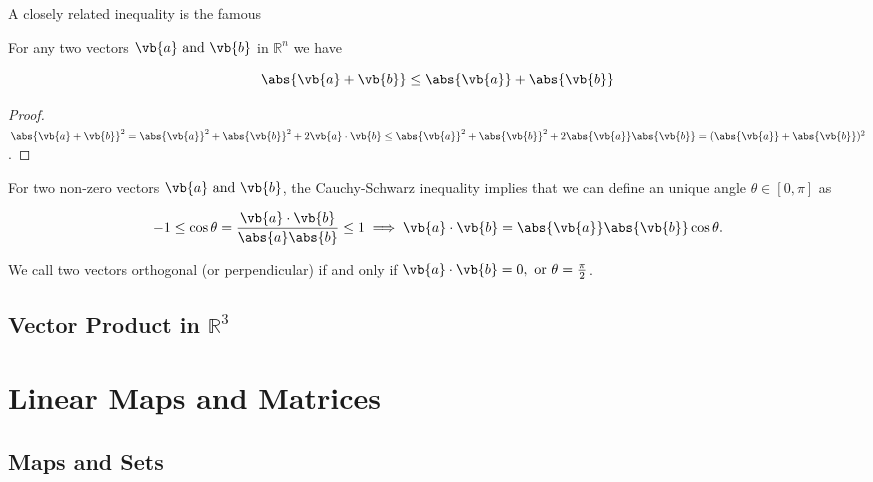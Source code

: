 \documentclass[a4paper,12pt]{report}
\begin{document}
A closely related inequality is the famous

\begin{lemma}
For any two vectors \(\vb{a} \text { and } \vb{b} \) in \(\mathbb{R}^{n} \) we have

\begin{equation}
    \abs{\vb{a} + \vb{b} } \le \abs{\vb{a} } + \abs{\vb{b} }   
\end{equation}
\end{lemma}

\begin{proof}
\(\abs{\vb{a} +\vb{b} }^2 = \abs{\vb{a} }^2 + \abs{\vb{b} }^2 + 2 \vb{a} \cdot \vb{b} \le \abs{\vb{a} }^2 + \abs{\vb{b} }^2 + 2\abs{\vb{a} }\abs{\vb{b} } = (\abs{\vb{a} } + \abs{\vb{b} }  )^2      \). 
\end{proof}

For two non-zero vectors \(\vb{a} \text { and } \vb{b} \), the Cauchy-Schwarz inequality implies that we can define an unique angle \(\theta \in [0,\pi ]\) as

\begin{equation}
    -1 \le \cos \theta = \frac{\vb{a} \cdot \vb{b} }{\abs{a}\abs{b}  } \le 1 \implies \vb{a} \cdot \vb{b} = \abs{\vb{a} } \abs{\vb{b} }\cos \theta .  
\end{equation}

We call two vectors orthogonal (or perpendicular) if and only if \(\vb{a} \cdot \vb{b} = 0, \text { or }  \theta = \frac{\pi }{2} \).

\section{Vector Product in \(\mathbb{R}^3 \) }








\chapter{Linear Maps and Matrices}

\section{Maps and Sets}
\end{document}
